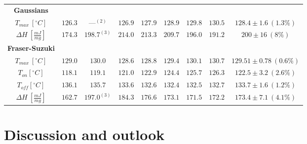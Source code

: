\documentclass{scrartcl}[12pt, halfparskip]
\numberwithin{equation}{section}
\numberwithin{figure}{section}
\numberwithin{table}{section}
\begin{document}
\begin{table}[H]
\begin{tabular}{| c | c | c | c | c | c | c | c || c |}
		\textbf{Gaussians} & & & & & & & & \\[0.7ex]
		$T_{max} \ [^{\circ}C]$ & $126.3$ & ---$^{(2)}$ & $126.9$ & $127.9$ & $128.9$ & $129.8$ & $130.5$ & $128.4 \pm 1.6 \ (1.3\%)$ \\[0.7ex]
		$\Delta H \ [\frac{mJ}{mg}]$ & $174.3$ & $198.7^{(3)}$ & $214.0$ & $213.3$ & $209.7$ & $196.0$ & $191.2$ & $200 \pm 16 \ (8\%)$ \\ \hline
		
		
		\textbf{Fraser-Suzuki} & & & & & & & & \\[0.7ex]
		$T_{max} \ [^{\circ}C]$ & $129.0$ & $130.0$ & $128.6$ & $128.8$ & $129.4$ & $130.1$ & $130.7$ & $129.51 \pm 0.78 \ (0.6\%)$ \\[0.7ex]
		$T_{on} [^{\circ} C]$ & $118.1$ & $119.1$ & $121.0$ & $122.9$ & $124.4$ & $125.7$ & $126.3$ & $122.5 \pm 3.2 \ (2.6\%)$ \\[0.7ex]
		$T_{off} [^{\circ} C]$ & $136.1$ & $135.7$ & $133.6$ & $132.6$ & $132.4$ & $132.5$ & $132.7$ & $133.7 \pm 1.6 \ (1.2\%)$ \\[0.7ex]
		$\Delta H \ [\frac{mJ}{mg}]$ & $162.7$ & $197.0^{(3)}$ & $184.3$ & $176.6$ & $173.1$ & $171.5$ & $172.2$ & $173.4 \pm 7.1 \ (4.1\%)$ \\ \hline
	\end{tabular}
	\label{tab:eval_table_summary}
\end{table}




\newpage
\section{Discussion and outlook}
\label{sec:discussion}
\end{document}
